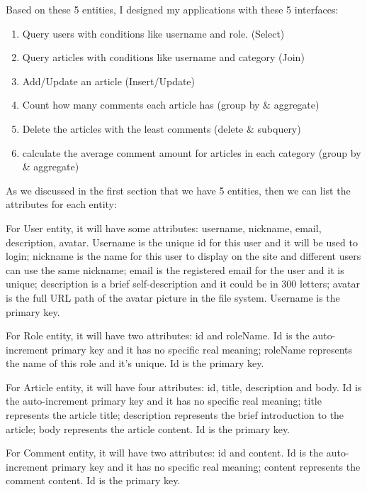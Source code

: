 \documentclass[11pt]{homework}
\begin{document}
Based on these 5 entities, I designed my applications with these 5 interfaces:
\begin{enumerate}
  \item Query users with conditions like username and role. (Select)
  \item Query articles with conditions like username and category (Join)
  \item Add/Update an article (Insert/Update)
  \item Count how many comments each article has (group by \& aggregate)
  \item Delete the articles with the least comments (delete \& subquery)
  \item calculate the average comment amount for articles in each category (group by \& aggregate)
\end{enumerate}










As we discussed in the first section that we have 5 entities, then we can list the attributes for each entity:

For User entity, it will have some attributes: username, nickname, email, description, avatar. Username is the unique id for
this user and it will be used to login; nickname is the name for this user to display on the site and different 
users can use the same nickname; email is the registered email for the user and it is unique; description is a
brief self-description and it could be in 300 letters; avatar is the full URL path of the avatar picture in the 
file system. Username is the primary key.

For Role entity, it will have two attributes: id and roleName. Id is the auto-increment primary key and it has no
specific real meaning; roleName represents the name of this role and it's unique. Id is the primary key.

For Article entity, it will have four attributes: id, title, description and body. Id is the auto-increment primary key and it has no
specific real meaning; title represents the article title; description represents the brief introduction to the article;
body represents the article content. Id is the primary key.

For Comment entity, it will have two attributes: id and content. Id is the auto-increment primary key and it has no
specific real meaning; content represents the comment content. Id is the primary key.
\end{document}
